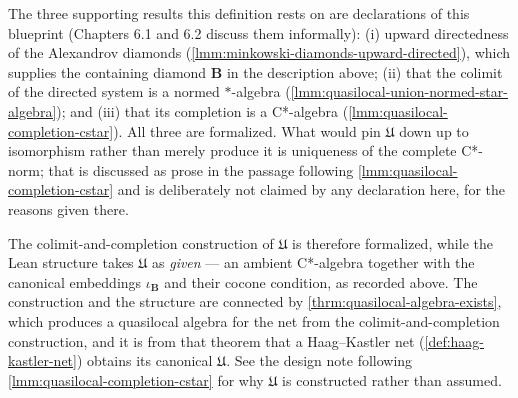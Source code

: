 \begin{definition}
    The three supporting results this definition rests on are declarations of this blueprint (Chapters 6.1 and 6.2 discuss them informally): (i) upward directedness of the Alexandrov diamonds (\ref{lmm:minkowski-diamonds-upward-directed}), which supplies the containing diamond $\mathbf{B}$ in the description above; (ii) that the colimit of the directed system is a normed $*$-algebra (\ref{lmm:quasilocal-union-normed-star-algebra}); and (iii) that its completion is a C*-algebra (\ref{lmm:quasilocal-completion-cstar}). All three are formalized. What would pin $\mathfrak{U}$ down up to isomorphism rather than merely produce it is uniqueness of the complete C*-norm; that is discussed as prose in the passage following \ref{lmm:quasilocal-completion-cstar} and is deliberately not claimed by any declaration here, for the reasons given there.

    The colimit-and-completion construction of $\mathfrak{U}$ is therefore formalized, while the Lean structure takes $\mathfrak{U}$ as \emph{given} --- an ambient C*-algebra together with the canonical embeddings $\iota_{\mathbf{B}}$ and their cocone condition, as recorded above. The construction and the structure are connected by \ref{thrm:quasilocal-algebra-exists}, which produces a quasilocal algebra for the net from the colimit-and-completion construction, and it is from that theorem that a Haag--Kastler net (\ref{def:haag-kastler-net}) obtains its canonical $\mathfrak{U}$. See the design note following \ref{lmm:quasilocal-completion-cstar} for why $\mathfrak{U}$ is constructed rather than assumed.
\end{definition}

